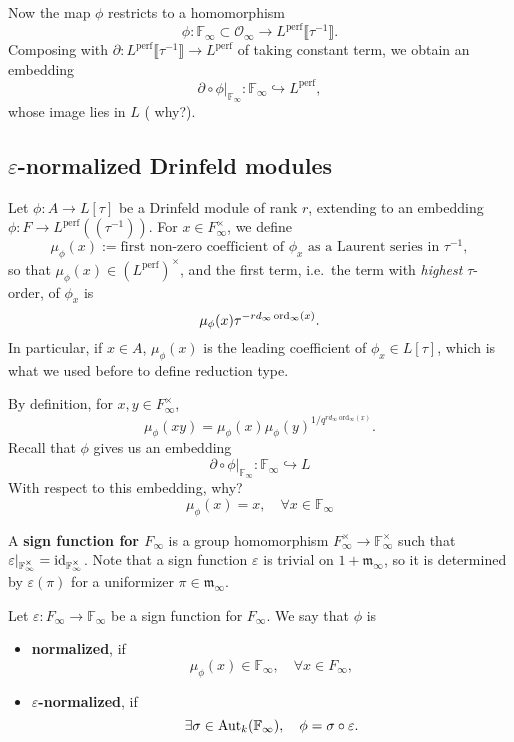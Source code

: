 \documentclass{article}
\newcommand{\F}{\mathbb{F}}
\newcommand{\perf}{\mathrm{perf}}
\renewcommand{\O}{\mathcal{O}}
\newcommand{\m}{\mathfrak{m}}
\begin{document}
Now the map $\phi$ restricts to a homomorphism
\[\phi : \F_\infty\subset\O_\infty\to L^\perf\llbracket \tau^{-1} \rrbracket.\]
Composing with $\partial : L^{\perf}\llbracket \tau^{-1} \rrbracket\to L^\perf$ of taking constant term,
we obtain an embedding \[\partial\circ\phi|_{\F_\infty} : \F_\infty\hookrightarrow L^\perf,\]
whose image lies in $L$ ({\color{red} why?}).


\subsection{\texorpdfstring{$\varepsilon$}{epsilon}-normalized Drinfeld modules}

Let $\phi : A\to L[\tau]$ be a Drinfeld module of rank $r$, extending to an embedding $\phi : F\to L^\perf((\tau^{-1}))$.
For $x\in F_\infty^\times$,
we define \[\mu_\phi(x) := \text{first non-zero coefficient of }\phi_x\text{ as a Laurent series in }\tau^{-1},\]
so that $\mu_\phi(x)\in (L^\perf)^\times$,
and the first term, i.e.\ the term with \textit{highest} $\tau$-order, of $\phi_x$ is
\[\mu_\phi(x)\tau^{-rd_\infty\operatorname{ord}_\infty(x)}.\]
In particular, if $x\in A$, $\mu_\phi(x)$ is the leading coefficient of $\phi_x\in L[\tau]$,
which is what we used before to define reduction type.


By definition, for $x, y\in F_\infty^\times$,
\[\mu_\phi(xy)=\mu_\phi(x)\mu_\phi(y)^{1/q^{rd_\infty\mathrm{~ord}_\infty(x)}}.\]
Recall that $\phi$ gives us an embedding
\[\partial\circ\phi|_{\F_\infty} : \F_\infty\hookrightarrow L\]
With respect to this embedding, {\color{red} why?}
\[\mu_\phi(x) = x, \quad\forall x\in\F_\infty\]
\begin{definition}
    A \textbf{sign function for $F_\infty$} is a
    group homomorphism $F_\infty^\times\to\F_\infty^\times$ such that $\varepsilon|_{\F_\infty^\times} = \Id_{\F_\infty^\times}$.
    Note that a sign function $\varepsilon$ is trivial on $1 + \m_\infty$,
    so it is determined by $\varepsilon(\pi)$ for a uniformizer $\pi\in\m_\infty$.
\end{definition}


Let $\varepsilon : F_\infty\to\F_\infty$ be a sign function for $F_\infty$. 
We say that $\phi$ is \begin{itemize}
    \item \textbf{normalized}, if \[\mu_\phi(x)\in \F_\infty,\quad \forall x\in F_\infty,\]
    \item $\varepsilon$\textbf{-normalized},
    if \[\exists\sigma\in\aut_k(\F_\infty),\quad \phi = \sigma\circ\varepsilon.\]
\end{itemize}
\end{document}
